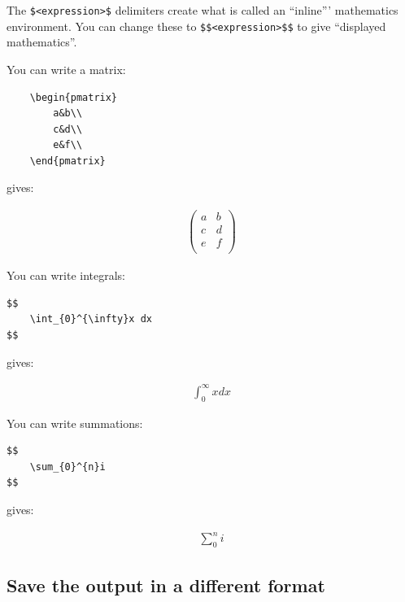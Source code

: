 The \texttt{\$<expression>\$} delimiters create what is called an ``inline'''
mathematics environment.
You can change these to \texttt{\$\$<expression>\$\$} to give ``displayed
mathematics''.


You can write a matrix:

\begin{verbatim}
    \begin{pmatrix}
        a&b\\
        c&d\\
        e&f\\
    \end{pmatrix}
\end{verbatim}


gives:

\begin{equation*}
\begin{split}
    \begin{pmatrix}
        a&b\\
        c&d\\
        e&f\\
    \end{pmatrix}
\end{split}
\end{equation*}

You can write integrals:

\begin{verbatim}
$$
    \int_{0}^{\infty}x dx
$$
\end{verbatim}


gives:

\begin{equation*}
\begin{split}
    \int_{0}^{\infty}x dx
\end{split}
\end{equation*}

You can write summations:

\begin{verbatim}
$$
    \sum_{0}^{n}i
$$
\end{verbatim}


gives:

\begin{equation*}
\begin{split}
    \sum_{0}^{n}i
\end{split}
\end{equation*}

\subsection{Save the output in a different format}

